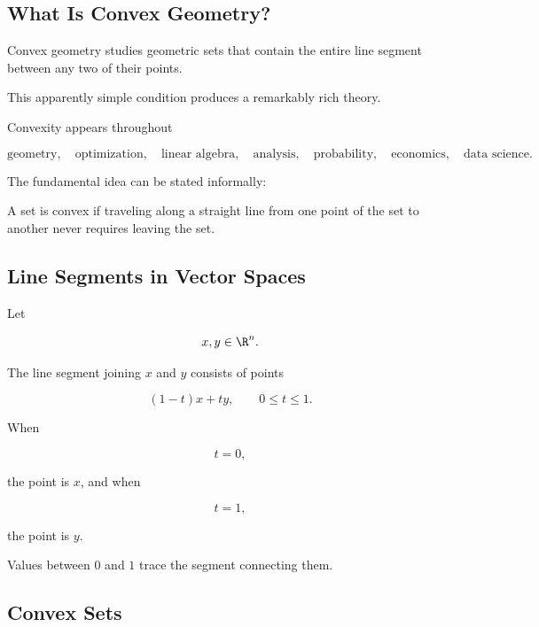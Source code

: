 \subsection{What Is Convex Geometry?}
\label{subsec:what-is-convex-geometry}

Convex geometry studies geometric sets that contain the entire line segment
between any two of their points.

This apparently simple condition produces a remarkably rich theory.

Convexity appears throughout

\[
\boxed{
\text{geometry},
\quad
\text{optimization},
\quad
\text{linear algebra},
\quad
\text{analysis},
\quad
\text{probability},
\quad
\text{economics},
\quad
\text{data science}.
}
\]

The fundamental idea can be stated informally:

\begin{conceptbox}
A set is convex if traveling along a straight line from one point of the set
to another never requires leaving the set.
\end{conceptbox}

\subsection{Line Segments in Vector Spaces}
\label{subsec:convex-line-segments}

Let

\[
x,y\in\R^n.
\]

The line segment joining \(x\) and \(y\) consists of points

\[
\boxed{
(1-t)x+ty,
\qquad
0\leq t\leq1.
}
\]

When

\[
t=0,
\]

the point is \(x\), and when

\[
t=1,
\]

the point is \(y\).

Values between \(0\) and \(1\) trace the segment connecting them.

\subsection{Convex Sets}
\label{subsec:convex-sets}

